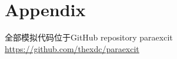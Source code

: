 \appendix
\section{Appendix}

全部模拟代码位于GitHub repository paraexcit \url{https://github.com/thexdc/paraexcit}